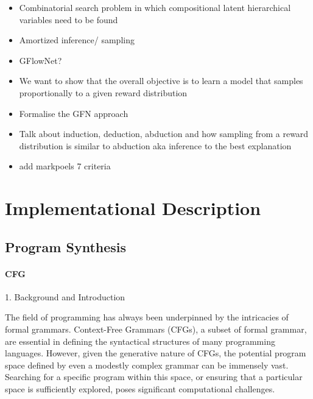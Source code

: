 
\begin{itemize}
    \item Combinatorial search problem in which compositional latent hierarchical variables need to be found
    \item Amortized inference/ sampling
    \item GFlowNet?
    \item We want to show that the overall objective is to learn a model that samples proportionally to a given reward distribution
    \item Formalise the GFN approach
    \item Talk about induction, deduction, abduction and how sampling from a reward distribution is similar to abduction aka inference to the best explanation
    \item add markpoels 7 criteria 
\end{itemize}


\chapter{Implementational Description}


\section{Program Synthesis}

\subsubsection{CFG}

1. Background and Introduction

The field of programming has always been underpinned by the intricacies of formal grammars. Context-Free Grammars (CFGs), a subset of formal grammar, are essential in defining the syntactical structures of many programming languages. However, given the generative nature of CFGs, the potential program space defined by even a modestly complex grammar can be immensely vast. Searching for a specific program within this space, or ensuring that a particular space is sufficiently explored, poses significant computational challenges.


